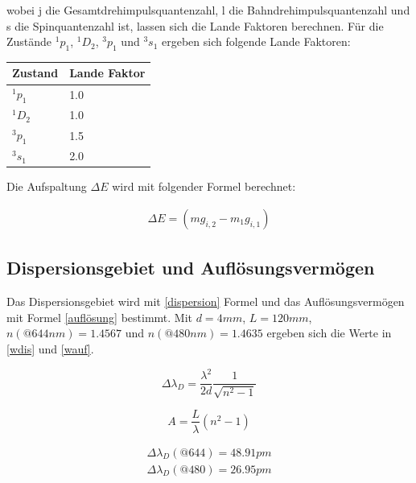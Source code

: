 \noindent wobei j die Gesamtdrehimpulsquantenzahl, l die Bahndrehimpulsquantenzahl und s die Spinquantenzahl ist, lassen sich die Lande Faktoren berechnen.
Für die Zustände $^1p_1$, $^1D_2$, $^3p_1$ und $^3s_1$ ergeben sich folgende Lande Faktoren:

\begin{minipage}{\linewidth}
    \begin{table}[H]
        \centering
    \begin{tabular}{ll}
        \toprule
        Zustand & Lande Faktor \\
        \midrule
        $^1p_1$ & 1.0 \\
        $^1D_2$ & 1.0 \\
        $^3p_1$ & 1.5 \\
        $^3s_1$ & 2.0 \\
        \bottomrule   
    \end{tabular}
    
    \label{tab:1}
\end{table}
\end{minipage}

\noindent Die Aufspaltung $\Delta E$ wird mit folgender Formel berechnet:

\begin{align}
    \Delta E = (mg_{i,2}-m_1g_{i,1})
\end{align}

\subsection{Dispersionsgebiet und Auflösungsvermögen}

Das Dispersionsgebiet wird mit \ref{dispersion} Formel und das Auflösungsvermögen mit Formel \ref{auflösung} bestimmt. Mit $d = 4 mm$, $L = 120mm$, $n(@644nm) = 1.4567$ und $n(@480nm) = 1.4635$ ergeben sich die Werte in \ref{wdis} und \ref{wauf}.

\begin{equation} \label{dispersion}
    \Delta \lambda_D = \frac{\lambda^2}{2d} \frac{1}{\sqrt{n^2-1}}
\end{equation}

\begin{equation} \label{auflösung}
    A = \frac{L}{\lambda} (n^2-1)
\end{equation}

\begin{align} \label{wdis}
    \Delta \lambda_D(@644) =  48.91pm \\
    \Delta \lambda_D(@480) =  26.95pm 
\end{align}

